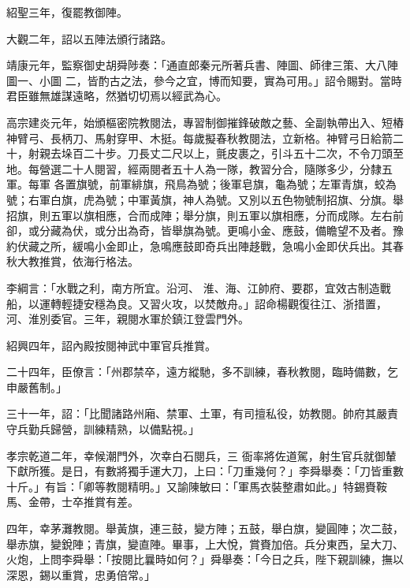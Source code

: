 \begin{pinyinscope}
 紹聖三年，復罷教御陣。



 大觀二年，詔以五陣法頒行諸路。



 靖康元年，監察御史胡舜陟奏：「通直郎秦元所著兵書、陣圖、師律三策、大八陣圖一、小圖
 二，皆酌古之法，參今之宜，博而知要，實為可用。」詔令賜對。當時君臣雖無雄謀遠略，然猶切切焉以經武為心。



 高宗建炎元年，始頒樞密院教閱法，專習制御摧鋒破敵之藝、全副執帶出入、短樁神臂弓、長柄刀、馬射穿甲、木挺。每歲擬春秋教閱法，立新格。神臂弓日給箭二十，射親去垛百二十步。刀長丈二尺以上，氈皮裹之，引斗五十二次，不令刀頭至地。每營選二十人閱習，經兩閱者五十人為一隊，教習分合，隨隊多少，分隸五軍。每軍
 各置旗號，前軍緋旗，飛鳥為號；後軍皂旗，龜為號；左軍青旗，蛟為號；右軍白旗，虎為號；中軍黃旗，神人為號。又別以五色物號制招旗、分旗。舉招旗，則五軍以旗相應，合而成陣；舉分旗，則五軍以旗相應，分而成隊。左右前卻，或分藏為伏，或分出為奇，皆舉旗為號。更鳴小金、應鼓，備瞻望不及者。豫約伏藏之所，緩鳴小金即止，急鳴應鼓即奇兵出陣趍戰，急鳴小金即伏兵出。其春秋大教推賞，依海行格法。



 李綱言：「水戰之利，南方所宜。沿河、
 淮、海、江帥府、要郡，宜效古制造戰船，以運轉輕捷安穩為良。又習火攻，以焚敵舟。」詔命楊觀復往江、浙措置，河、淮別委官。三年，親閱水軍於鎮江登雲門外。



 紹興四年，詔內殿按閱神武中軍官兵推賞。



 二十四年，臣僚言：「州郡禁卒，遠方縱馳，多不訓練，春秋教閱，臨時備數，乞申嚴舊制。」



 三十一年，詔：「比聞諸路州廂、禁軍、土軍，有司擅私役，妨教閱。帥府其嚴責守兵勤兵歸營，訓練精熟，以備點視。」



 孝宗乾道二年，幸候潮門外，次幸白石閱兵，三
 衙率將佐道駕，射生官兵就御輦下獻所獲。是日，有數將獨手運大刀，上曰：「刀重幾何？」李舜舉奏：「刀皆重數十斤。」有旨：「卿等教閱精明。」又諭陳敏曰：「軍馬衣裝整肅如此。」特錫賚鞍馬、金帶，士卒推賞有差。



 四年，幸茅灘教閱。舉黃旗，連三鼓，變方陣；五鼓，舉白旗，變圓陣；次二鼓，舉赤旗，變銳陣；青旗，變直陣。畢事，上大悅，賞賚加倍。兵分東西，呈大刀、火炮，上問李舜舉：「按閱比曩時如何？」舜舉奏：「今日之兵，陛下親訓練，撫以深恩，錫以重賞，忠勇倍常。」




\end{pinyinscope}
